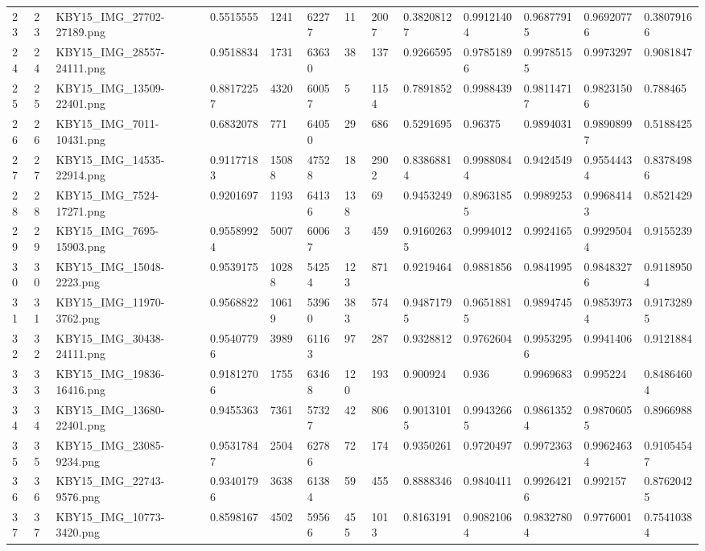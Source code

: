 \documentclass[11pt, a4paper, twoside]{report}
\begin{document}
\begin{longtable}[c]{@{}lllllllllllll@{}}
23 & 23 & KBY15\_IMG\_27702-27189.png & 0.5515555 & 1241 & 62277 & 11 & 2007 & 0.38208127 & 0.99121404 & 0.96877915 & 0.96920776 & 0.38079166 \\
24 & 24 & KBY15\_IMG\_28557-24111.png & 0.9518834 & 1731 & 63630 & 38 & 137 & 0.9266595 & 0.97851896 & 0.99785155 & 0.9973297 & 0.9081847 \\
25 & 25 & KBY15\_IMG\_13509-22401.png & 0.88172257 & 4320 & 60057 & 5 & 1154 & 0.7891852 & 0.9988439 & 0.98114717 & 0.98231506 & 0.788465 \\
26 & 26 & KBY15\_IMG\_7011-10431.png & 0.6832078 & 771 & 64050 & 29 & 686 & 0.5291695 & 0.96375 & 0.9894031 & 0.98908997 & 0.5188425 \\
27 & 27 & KBY15\_IMG\_14535-22914.png & 0.91177183 & 15088 & 47528 & 18 & 2902 & 0.83868814 & 0.99880844 & 0.9424549 & 0.95544434 & 0.83784986 \\
28 & 28 & KBY15\_IMG\_7524-17271.png & 0.9201697 & 1193 & 64136 & 138 & 69 & 0.9453249 & 0.89631855 & 0.9989253 & 0.99684143 & 0.8521429 \\
29 & 29 & KBY15\_IMG\_7695-15903.png & 0.95589924 & 5007 & 60067 & 3 & 459 & 0.91602635 & 0.9994012 & 0.9924165 & 0.99295044 & 0.9155239 \\
30 & 30 & KBY15\_IMG\_15048-2223.png & 0.9539175 & 10288 & 54254 & 123 & 871 & 0.9219464 & 0.9881856 & 0.9841995 & 0.98483276 & 0.91189504 \\
31 & 31 & KBY15\_IMG\_11970-3762.png & 0.9568822 & 10619 & 53960 & 383 & 574 & 0.94871795 & 0.96518815 & 0.9894745 & 0.98539734 & 0.91732895 \\
32 & 32 & KBY15\_IMG\_30438-24111.png & 0.95407796 & 3989 & 61163 & 97 & 287 & 0.9328812 & 0.9762604 & 0.99532956 & 0.9941406 & 0.9121884 \\
33 & 33 & KBY15\_IMG\_19836-16416.png & 0.91812706 & 1755 & 63468 & 120 & 193 & 0.900924 & 0.936 & 0.9969683 & 0.995224 & 0.84864604 \\
34 & 34 & KBY15\_IMG\_13680-22401.png & 0.9455363 & 7361 & 57327 & 42 & 806 & 0.90131015 & 0.99432665 & 0.98613524 & 0.98706055 & 0.8966988 \\
35 & 35 & KBY15\_IMG\_23085-9234.png & 0.95317847 & 2504 & 62786 & 72 & 174 & 0.9350261 & 0.9720497 & 0.9972363 & 0.99624634 & 0.91054547 \\
36 & 36 & KBY15\_IMG\_22743-9576.png & 0.93401796 & 3638 & 61384 & 59 & 455 & 0.8888346 & 0.9840411 & 0.99264216 & 0.992157 & 0.87620425 \\
37 & 37 & KBY15\_IMG\_10773-3420.png & 0.8598167 & 4502 & 59566 & 455 & 1013 & 0.8163191 & 0.90821064 & 0.98327804 & 0.9776001 & 0.75410384 \\

\end{longtable}
\end{document}
